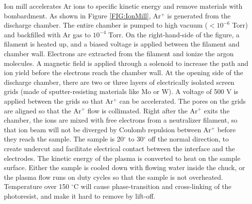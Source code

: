 \documentclass[pdflatex, sectionletters, 12pt, final, phd]{pittetd}    %
\begin{document}
Ion mill accelerates Ar ions to specific kinetic energy and remove materials with bombardment. As shown in Figure \ref{FIG:IonMill}, Ar$^+$ is generated from the discharge chamber. The entire chamber is pumped to high vacuum ($< 10^{-6}$ Torr) and backfilled with Ar gas to $10^{-4}$ Torr. On the right-hand-side of the figure, a filament is heated up, and a biased voltage is applied between the filament and chamber wall. Electrons are extracted from the filament and ionize the argon molecules. A magnetic field is applied through a solenoid to increase the path and ion yield before the electrons reach the chamber wall. At the opening side of the discharge chamber, there are two or three layers of electrically isolated screen grids (made of sputter-resisting materials like Mo or W). A voltage of 500 V is applied between the grids so that Ar$^+$ can be accelerated. The pores on the grids are aligned so that the Ar$^{+}$ flow is collimated. Right after the Ar$^{+}$ exits the chamber, the ions are mixed with free electrons from a neutralizer filament, so that ion beam will not be diverged by Coulomb repulsion between Ar$^{+}$ before they reach the sample. The sample is 20$^{\circ}$ to 30$^{\circ}$ off the normal direction, to create undercut and facilitate electrical contact between the interface and the electrodes. The kinetic energy of the plasma is converted to heat on the sample surface. Either the sample is cooled down with flowing water inside the chuck, or the plasma flow runs on duty cycles so that the sample is not overheated. Temperature over 150 $^{\circ}$C will cause phase-transition and cross-linking of the photoresist, and make it hard to remove by lift-off.
\end{document}
